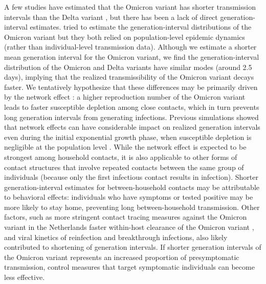 \documentclass[12pt]{article}
\begin{document}
A few studies have estimated that the Omicron variant has shorter transmission intervals than the Delta variant \citep{abbott2022test,kremer2022observed,song2022serial}, but there has been a lack of direct generation-interval estimates.
\cite{ito2022estimating,selby2022generation} tried to estimate the generation-interval distributions of the Omicron variant but they both relied on population-level epidemic dynamics (rather than individual-level transmission data).
Although we estimate a shorter mean generation interval for the Omicron variant, we find the generation-interval distribution of the Omicron and Delta variants have similar modes (around 2.5 days), implying that the realized transmissibility of the Omicron variant decays faster.
We tentatively hypothesize that these differences may be primarily driven by the network effect \citep{park2020inferring,hart2022generation}: a higher reproduction number of the Omicron variant leads to faster susceptible depletion among close contacts, which in turn prevents long generation intervals from generating infections. 
Previous simulations showed that network effects can have considerable impact on realized generation intervals even during the initial exponential growth phase, when susceptible depletion is negligible at the population level \citep{park2020inferring}.
While the network effect is expected to be strongest among household contacts, it is also applicable to other forms of contact structures that involve repeated contacts between the same group of individuals (because only the first infectious contact results in infection).
Shorter generation-interval estimates for between-household contacts may be attributable to behavioral effects: individuals who have symptoms or tested positive may be more likely to stay home, preventing long between-household transmission.
Other factors, such as more stringent contact tracing measures against the Omicron variant in the Netherlands \citep{backer2021omicron} faster within-host clearance of the Omicron variant \citep{hay2022viral}, and viral kinetics of reinfection and breakthrough infections, also likely contributed to shortening of generation intervals.
If shorter generation intervals of the Omicron variant represents an increased proportion of presymptomatic transmission, control measures that target symptomatic individuals can become less effective.
\end{document}
